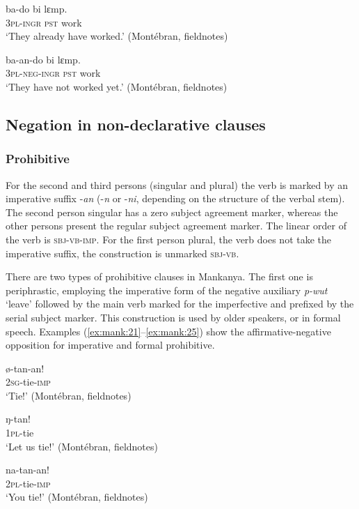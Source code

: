 \documentclass[output=paper,colorlinks,citecolor=brown]{langscibook}
\begin{document}
\ea\label{ex:mank:19}
    \gll ba-do bi lɛmp.\\
         \textsc{3pl-ingr} \textsc{pst} work \\ 
    \glt ‘They already have worked.’ (Montébran, fieldnotes)
\z

\ea\label{ex:mank:20}
    \gll ba-an-do bi lɛmp. \\
        \textsc{3pl{}-neg-ingr} \textsc{pst} work \\
    \glt ‘They have not worked yet.’ (Montébran, fieldnotes)
\z

\subsection{Negation in non-declarative clauses}\label{sec:mank:2.2}
\subsubsection{Prohibitive}\label{sec:mank:2.2.1}

For the second and third persons (singular and plural) the verb is marked by an imperative suffix -\textit{an} (-\textit{n} or -\textit{ni}, depending on the structure of the verbal stem). The second person singular has a zero subject agreement marker, whereas the other persons present the regular subject agreement marker. The linear order of the verb is \textsc{sbj-vb-imp.} For the first person plural, the verb does not take the imperative suffix, the construction is unmarked \textsc{sbj-vb}.

There are two types of prohibitive clauses in Mankanya. The first one is periphrastic, employing the imperative form of the negative auxiliary \textit{p-wut} ‘leave’ followed by the main verb marked for the imperfective and prefixed by the serial subject marker.
This construction is used by older speakers, or in formal speech. Examples (\ref{ex:mank:21}--\ref{ex:mank:25}) show the affirmative-negative opposition for imperative and formal prohibitive.


\ea\label{ex:mank:21}
    \gll ø-tan-an!\\
         \textsc{2sg}-tie-\textsc{imp} \\
    \glt ‘Tie!’ (Montébran, fieldnotes)
\z

\ea\label{ex:mank:22}
    \gll ŋ-tan!\\
         \textsc{1pl}-tie\\
    \glt ‘Let us tie!’ (Montébran, fieldnotes)
\z

\ea\label{ex:mank:23}
    \gll na-tan-an!\\
         \textsc{2pl}-tie-\textsc{imp}\\
    \glt ‘You tie!’ (Montébran, fieldnotes)
\z
\end{document}
